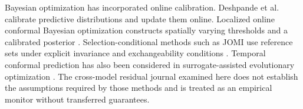 \documentclass[]{interact}
\begin{document}
Bayesian optimization has incorporated online calibration. Deshpande et al.~\citep{ref12} calibrate predictive distributions and update them online. Localized online conformal Bayesian optimization constructs spatially varying thresholds and a calibrated posterior \citep{ref13}. Selection-conditional methods such as JOMI use reference sets under explicit invariance and exchangeability conditions \citep{ref14}. Temporal conformal prediction has also been considered in surrogate-assisted evolutionary optimization \citep{ref15}. The cross-model residual journal examined here does not establish the assumptions required by those methods and is treated as an empirical monitor without transferred guarantees.

\FloatBarrier\begingroup\fontsize{8.5}{10.5}\selectfont\setlength\tabcolsep{3pt}
\end{document}
